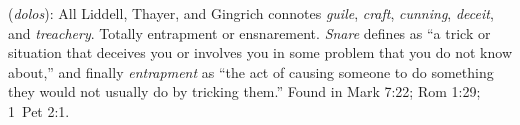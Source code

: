 \item[Ensnaring,]

(\textit{dolos}):
All Liddell, Thayer, and Gingrich connotes \emph{guile}, \emph{craft}, \emph{cunning}, \emph{deceit}, and \emph{treachery}. Totally entrapment or ensnarement. \emph{Snare} defines as ``a trick or situation that deceives you or involves you in some problem that you do not know about,'' and finally \emph{entrapment} as ``the act of causing someone to do something they would not usually do by tricking them.''
Found in Mark 7:22; Rom 1:29; 1~Pet 2:1.
